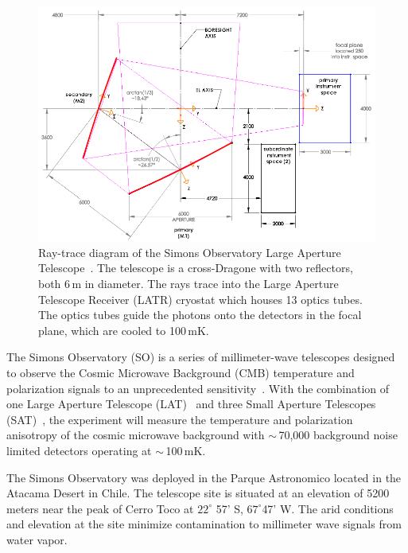\begin{figure}[t]
    \centering
    \includegraphics[width = .9\textwidth]{Figures/LAT_rt.pdf}
    \caption{Ray-trace diagram of the Simons Observatory Large Aperture Telescope~\cite{Parshley_2018}.  The telescope is a cross-Dragone with two reflectors, both 6\,m in diameter.  The rays trace into the Large Aperture Telescope Receiver (LATR) cryostat which houses 13 optics tubes.  The optics tubes guide the photons onto the detectors in the focal plane, which are cooled to 100\,mK.}
    \label{fig:so_inst}
\end{figure}

The Simons Observatory (SO) is a series of millimeter-wave telescopes designed to observe the Cosmic Microwave Background (CMB) temperature and polarization signals to an unprecedented sensitivity~\cite{gali18, so19}. With the combination of one Large Aperture Telescope (LAT)~\cite{xu/etal:2020c, zhu18, orlo18, coppi/etal:2018} and three Small Aperture Telescopes (SAT)~\cite{ali20}, the experiment will measure the temperature and polarization anisotropy of the cosmic microwave background with $\sim$\,70,000 background noise limited detectors operating at $\sim$\,100\,mK. 

The Simons Observatory was deployed in the Parque Astronomico located in the Atacama Desert in Chile. The telescope site is situated at an elevation of 5200 meters near the peak of Cerro Toco at $22 ^\circ$ 57' S, $67^\circ$47' W. The arid conditions and elevation at the site minimize contamination to millimeter wave signals from water vapor. 

